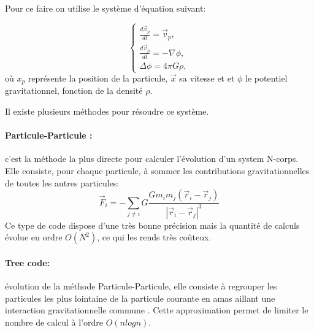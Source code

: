 Pour ce faire on utilise le système d'équation suivant:

\begin{equation}
\begin{cases}
\frac{d\vec{x}_p}{dt} = \vec{v}_p, \\
\frac{d\vec{v}_p}{dt} = -\nabla \phi , \\
\Delta \phi= 4\pi G \rho,
\end{cases}
\label{eq:Ncorps}
\end{equation}
où ${x}_p$ représente la position de la particule, $\vec{x}$ sa vitesse et et $\phi$ le potentiel gravitationnel, fonction de la densité $\rho$.

Il existe plusieurs méthodes pour résoudre ce système.
\paragraph{Particule-Particule : } c'est la méthode la plus directe pour calculer l'évolution d'un system N-corps. 
Elle consiste, pour chaque particule, à sommer les contributions gravitationnelles de toutes les autres particules:
\begin{equation}
\vec{F}_i=-\sum_{j\neq i} G \frac{G m_i m_j(\vec{r}_i - \vec{r}_j) }{ |\vec{r}_i - \vec{r}_j |^3}
\end{equation}
Ce type de code dispose d'une très bonne précision mais la quantité de calculs évolue en ordre $O(N^2)$, ce qui les rends très coûteux.

\paragraph{Tree code: } évolution de la méthode Particule-Particule, elle consiste à regrouper les particules les plus lointaine de la particule courante en amas aillant une interaction gravitationnelle commune \citep{1986Natur.324..446B}.
Cette approximation permet de limiter le nombre de calcul à l'ordre $O(n log n)$. %

